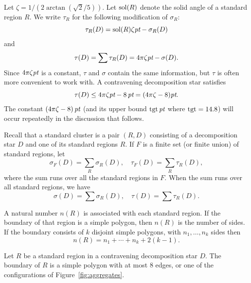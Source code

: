 Let $\zeta = 1/(2\arctan(\sqrt{2}/5))$. Let $\operatorname{sol}(R)$ denote the
solid angle of a standard region $R$.  We write $\tau_R$ for the
following modification of $\sigma_R$:
%
    \begin{equation}
    \tau_R(D) = \operatorname{sol}(R)\zeta\hbox{\it pt} - \sigma_R(D)
    \label{eqn:tauR-def}
    \end{equation}
and
    \begin{equation}
    \tau(D) = \sum\tau_R(D) = 4\pi\zeta\hbox{\it pt} - \sigma(D).
    \label{eqn:tau-def}
    \end{equation}
Since $4\pi\zeta\hbox{\it pt}$ is a constant, $\tau$ and $\sigma$ contain
the same information, but $\tau$ is often more convenient to work
with. A contravening decomposition star satisfies
    \begin{equation}
    \tau(D) \le 4\pi\zeta\hbox{\it pt} -8\,\hbox{\it pt} = (4\pi\zeta-8)\hbox{\it pt}.
    \label{eqn:tau-sig}
    \end{equation}
The constant $(4\pi\zeta-8)\,\hbox{\it pt}$  (and its upper bound ${\operatorname{tgt}}\,\hbox{\it pt}$
where ${\operatorname{tgt}}=14.8$) will occur repeatedly in the discussion
that follows.

Recall that a standard cluster is a pair $(R,D)$ consisting of a
decomposition star $D$ and one of its standard regions $R$. If $F$
is a finite set (or finite union) of standard regions, let
    \begin{equation}
    \sigma_F(D) = \sum_R \sigma_R(D),\quad \tau_F(D) =
    \sum_R\tau_R(D),
    \label{eqn:sig-F}
    \end{equation}
where the sum runs over all the standard regions in $F$.  When the
sum runs over all standard regions, we have
    \begin{equation}
    \sigma(D) = \sum\sigma_R(D),\quad \tau(D) =\sum\tau_R(D).
    \label{eqn:sig-all}
    \end{equation}

A natural number $n(R)$ is associated with each standard region.
If the boundary of that region is a simple polygon, then $n(R)$ is
the number of sides.   If the boundary consists of $k$ disjoint
simple polygons, with $n_1,\ldots,n_k$ sides then
    $$n(R) = n_1+\cdots+n_k + 2(k-1).$$

\begin{lemma}\label{cor:std-aggregate-list:bis}
Let $R$ be a standard region in a contravening decomposition star
$D$.  The boundary of $R$ is a simple polygon with at most $8$
edges, or one of the configurations of
Figure~\ref{fig:aggregates}.
\end{lemma}

